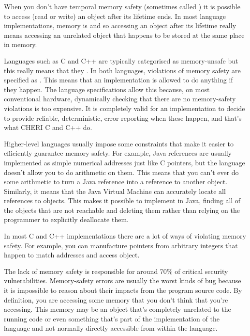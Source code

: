 When you don't have temporal memory safety (sometimes called ) it is possible to access (read or write) an object after its lifetime ends.
In most language implementations, memory is  and so accessing an object after its lifetime really means accessing an unrelated object that happens to be stored at the same place in memory.

Languages such as C and C++ are typically categorised as memory-unsafe but this really means that they .
In both languages, violations of memory safety are specified as .
This means that an implementation is allowed to do anything if they happen.
The language specifications allow this because, on most conventional hardware, dynamically checking that there are no memory-safety violations is too expensive.
It is completely valid for an implementation to decide to provide reliable, deterministic, error reporting when these happen, and that's what CHERI C and C++ do.

Higher-level languages usually impose some constraints that make it easier to efficiently guarantee memory safety.
For example, Java references are usually implemented as simple numerical addresses just like C pointers, but the language doesn't allow you to do arithmetic on them.
This means that you can't ever do some arithmetic to turn a Java reference into a reference to another object.
Similarly, it means that the Java Virtual Machine can accurately locate all references to objects.
This makes it possible to implement  in Java, finding all of the objects that are not reachable and deleting them rather than relying on the programmer to explicitly deallocate them.

In most C and C++ implementations there are a lot of ways of violating memory safety.
For example, you can manufacture pointers from arbitrary integers that happen to match addresses and access  object.

The lack of memory safety is responsible for around 70\% of critical security vulnerabilities.
Memory-safety errors are usually the worst kinds of bug because it is impossible to reason about their impacts from the program source code.
By definition, you are accessing some memory that you don't think that you're accessing.
This memory may be an object that's completely unrelated to the running code or even something that's part of the implementation of the language and not normally directly accessible from within the language.

